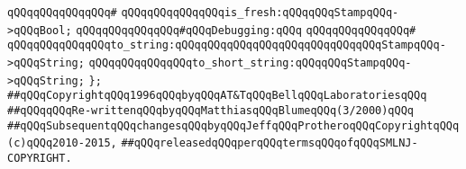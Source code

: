 \verb|qQQqqQQqqQQqqQQq#|\newline
\verb|qQQqqQQqqQQqqQQqis_fresh:qQQqqQQqStampqQQq->qQQqBool;|\newline
\newline
\verb|qQQqqQQqqQQqqQQq#qQQqDebugging:qQQq|\newline
\verb|qQQqqQQqqQQqqQQq#|\newline
\verb|qQQqqQQqqQQqqQQqto_string:qQQqqQQqqQQqqQQqqQQqqQQqqQQqqQQqStampqQQq->qQQqString;|\newline
\verb|qQQqqQQqqQQqqQQqto_short_string:qQQqqQQqStampqQQq->qQQqString;|\newline
\verb|};|\newline
\newline
\newline
\verb|##qQQqCopyrightqQQq1996qQQqbyqQQqAT&TqQQqBellqQQqLaboratoriesqQQq|\newline
\verb|##qQQqqQQqRe-writtenqQQqbyqQQqMatthiasqQQqBlumeqQQq(3/2000)qQQq|\newline
\verb|##qQQqSubsequentqQQqchangesqQQqbyqQQqJeffqQQqProtheroqQQqCopyrightqQQq(c)qQQq2010-2015,|\newline
\verb|##qQQqreleasedqQQqperqQQqtermsqQQqofqQQqSMLNJ-COPYRIGHT.|\newline

